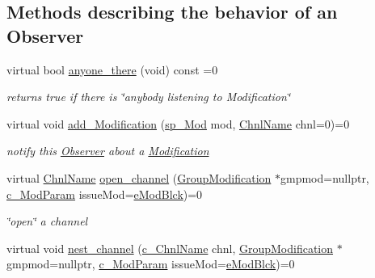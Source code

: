 \subsection*{Methods describing the behavior of an Observer}
\begin{DoxyCompactItemize}
\item 
virtual bool \mbox{\hyperlink{class_s_m_spp__di__unipi__it_1_1_observer_a7d8dd42bea99dfdb6fb967ba17993560}{anyone\+\_\+there}} (void) const =0
\begin{DoxyCompactList}\small\item\em returns true if there is \char`\"{}anybody listening to Modification\char`\"{} \end{DoxyCompactList}\item 
virtual void \mbox{\hyperlink{class_s_m_spp__di__unipi__it_1_1_observer_a4ac2234c8026ccbe13860a33fc4ef14e}{add\+\_\+\+Modification}} (\mbox{\hyperlink{group___modification___t_y_p_e_s_ga9024cf2ead61a1280d29771b063b1a62}{sp\+\_\+\+Mod}} mod, \mbox{\hyperlink{class_s_m_spp__di__unipi__it_1_1_observer_a54ce8db639626e45b1f20c289baa989b}{Chnl\+Name}} chnl=0)=0
\begin{DoxyCompactList}\small\item\em notify this \mbox{\hyperlink{class_s_m_spp__di__unipi__it_1_1_observer}{Observer}} about a \mbox{\hyperlink{class_s_m_spp__di__unipi__it_1_1_modification}{Modification}} \end{DoxyCompactList}\item 
virtual \mbox{\hyperlink{class_s_m_spp__di__unipi__it_1_1_observer_a54ce8db639626e45b1f20c289baa989b}{Chnl\+Name}} \mbox{\hyperlink{class_s_m_spp__di__unipi__it_1_1_observer_acf7e46d450779f524e3655c5f31eecc8}{open\+\_\+channel}} (\mbox{\hyperlink{class_s_m_spp__di__unipi__it_1_1_group_modification}{Group\+Modification}} $\ast$gmpmod=nullptr, \mbox{\hyperlink{group___modification___t_y_p_e_s_ga544246d8c462e9a2d817c2c30797968f}{c\+\_\+\+Mod\+Param}} issue\+Mod=\mbox{\hyperlink{group___modification___t_y_p_e_s_gga48fddcdd03a03f49b7e389ca1ed938d4a21b14b26b1c0093a0905f6fc010bad29}{e\+Mod\+Blck}})=0
\begin{DoxyCompactList}\small\item\em \char`\"{}open\char`\"{} a channel \end{DoxyCompactList}\item 
virtual void \mbox{\hyperlink{class_s_m_spp__di__unipi__it_1_1_observer_a4869c34f8f2a2286c39fdce0521b93c9}{nest\+\_\+channel}} (\mbox{\hyperlink{class_s_m_spp__di__unipi__it_1_1_observer_aa9ad8de42ffaf90023bfed5c085ad8bc}{c\+\_\+\+Chnl\+Name}} chnl, \mbox{\hyperlink{class_s_m_spp__di__unipi__it_1_1_group_modification}{Group\+Modification}} $\ast$gmpmod=nullptr, \mbox{\hyperlink{group___modification___t_y_p_e_s_ga544246d8c462e9a2d817c2c30797968f}{c\+\_\+\+Mod\+Param}} issue\+Mod=\mbox{\hyperlink{group___modification___t_y_p_e_s_gga48fddcdd03a03f49b7e389ca1ed938d4a21b14b26b1c0093a0905f6fc010bad29}{e\+Mod\+Blck}})=0

\end{DoxyCompactItemize}
